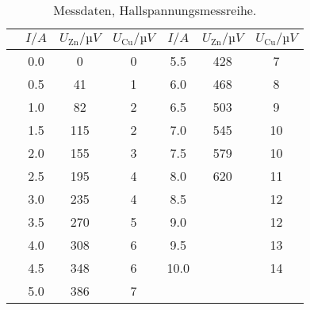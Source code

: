 \begin{table}
        \caption{Messdaten, Hallspannungsmessreihe.}
        \centering
        \label{datena}
        \begin{tabular}{
          l@{}
          S[round-mode=off, table-format=1.1]
          S[round-mode=off, table-format=3.0]
          S[round-mode=off, table-format=1.0]
          |
          S[round-mode=off, table-format=2.1]
          S[round-mode=off, table-format=3.0]
          S[round-mode=off, table-format=2.0]
        }
        \toprule
        & {$I/\si{A}$}& {$U_\text{Zn}/\si{µV}$}& {$U_\text{Cu}/\si{µV}$}& {$I/\si{A}$}& {$U_\text{Zn}/\si{µV}$}& {$U_\text{Cu}/\si{µV}$}\\
        \midrule
        &  0.0 & 0   & 0 & 5.5  & 428 & 7  \\
        &  0.5 & 41  & 1 & 6.0  & 468 & 8  \\
        &  1.0 & 82  & 2 & 6.5  & 503 & 9  \\
        &  1.5 & 115 & 2 & 7.0  & 545 & 10 \\
        &  2.0 & 155 & 3 & 7.5  & 579 & 10 \\
        &  2.5 & 195 & 4 & 8.0  & 620 & 11 \\
        &  3.0 & 235 & 4 & 8.5  & {}  & 12 \\
        &  3.5 & 270 & 5 & 9.0  & {}  & 12 \\
        &  4.0 & 308 & 6 & 9.5  & {}  & 13 \\
        &  4.5 & 348 & 6 & 10.0 & {}  & 14 \\
        &  5.0 & 386 & 7 &   {} & {}  & {} \\
 \bottomrule \end{tabular} \end{table}
